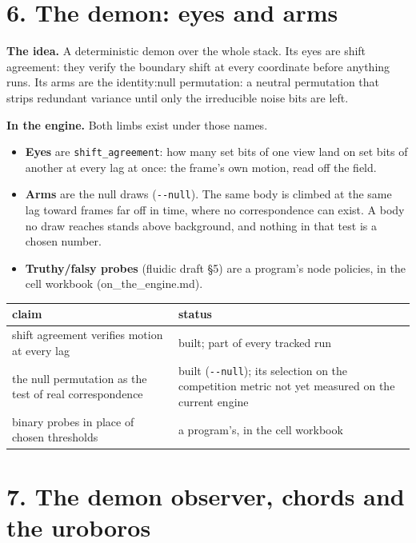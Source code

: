 \section{\texorpdfstring{6. The demon: eyes and arms}{6. The demon: eyes and arms}}

\textbf{The idea.} A deterministic demon over the whole stack. Its eyes are shift agreement: they verify the boundary shift at every coordinate before anything runs. Its arms are the identity:null permutation: a neutral permutation that strips redundant variance until only the irreducible noise bits are left.

\textbf{In the engine.} Both limbs exist under those names.

\begin{itemize}
\item \textbf{Eyes} are \texttt{shift\_\allowbreak{}agreement}: how many set bits of one view land on set bits of another at every lag at once: the frame's own motion, read off the field.
\item \textbf{Arms} are the null draws (\texttt{-\allowbreak{}-\allowbreak{}null}). The same body is climbed at the same lag toward frames far off in time, where no correspondence can exist. A body no draw reaches stands above background, and nothing in that test is a chosen number.
\item \textbf{Truthy/falsy probes} (fluidic draft §5) are a program's node policies, in the cell workbook (on\_\allowbreak{}the\_\allowbreak{}engine.md).
\end{itemize}

{\small
\setlength{\tabcolsep}{6pt}
\begin{longtable}{>{\RaggedRight\arraybackslash}p{}>{\RaggedRight\arraybackslash}p{}}
\toprule
claim & status \\
\midrule
\endhead
shift agreement verifies motion at every lag & built; part of every tracked run \\
the null permutation as the test of real correspondence & built (\texttt{-\allowbreak{}-\allowbreak{}null}); its selection on the competition metric not yet measured on the current engine \\
binary probes in place of chosen thresholds & a program's, in the cell workbook \\
\bottomrule
\end{longtable}
}

\section{\texorpdfstring{7. The demon observer, chords and the uroboros}{7. The demon observer, chords and the uroboros}}

